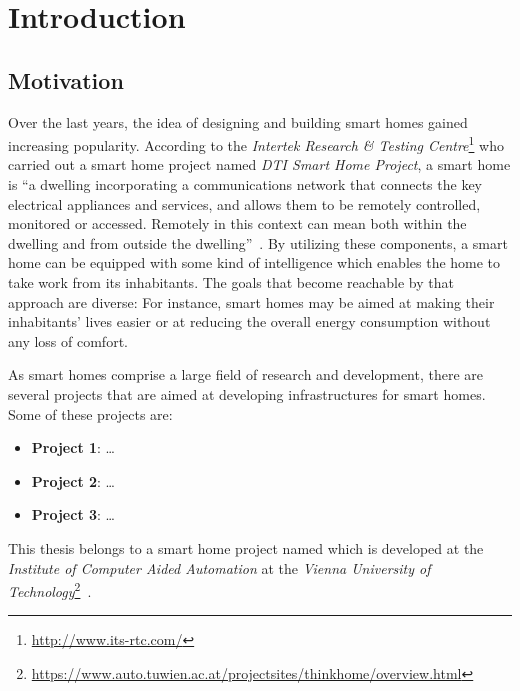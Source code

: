\chapter{Introduction}
\label{ch:intro}

\section{Motivation}

Over the last years, the idea of designing and building smart homes gained increasing popularity. According to the \emph{Intertek Research \& Testing Centre}\footnote{\href{http://www.its-rtc.com/}{http://www.its-rtc.com/}} who carried out a smart home project named \emph{DTI Smart Home Project}, a smart home is ``a dwelling incorporating a communications network that connects the key electrical appliances and services, and allows them to be remotely controlled, monitored or accessed. Remotely in this context can mean both within the dwelling and from outside the dwelling''~\cite{SmartHomeDefinition,SmartHomeResearch}. By utilizing these components, a smart home can be equipped with some kind of intelligence which enables the home to take work from its inhabitants. The goals that become reachable by that approach are diverse: For instance, smart homes may be aimed at making their inhabitants' lives easier or at reducing the overall energy consumption without any loss of comfort. %


As smart homes comprise a large field of research and development, there are several projects that are aimed at developing infrastructures for smart homes. Some of these projects are:
\begin{itemize}
  \item \textbf{Project 1}: …
  \item \textbf{Project 2}: …
  \item \textbf{Project 3}: …
\end{itemize}

This thesis belongs to a smart home project named \thinkhome which is developed at the \emph{Institute of Computer Aided Automation} at the \emph{Vienna University of Technology}\footnote{\href{https://www.auto.tuwien.ac.at/projectsites/thinkhome/overview.html}{https://www.auto.tuwien.ac.at/projectsites/thinkhome/overview.html}}~\cite{CR2011-TH_Journal,CR2010-DEST_ThinkHome}.


